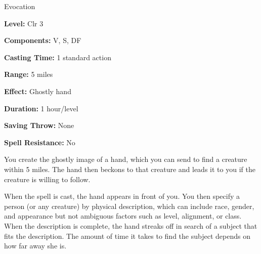 
Evocation

\textbf{Level:} Clr 3

\textbf{Components:} V, S, DF

\textbf{Casting Time:} 1 standard action

\textbf{Range:} 5 miles

\textbf{Effect:} Ghostly hand

\textbf{Duration:} 1 hour/level

\textbf{Saving Throw:} None

\textbf{Spell Resistance:} No

You create the ghostly image of a hand, which you can send to find a creature within 
5 miles. The hand then beckons to that creature and leads it to you if the creature 
is willing to follow.

When the spell is cast, the hand appears in front of you. You then specify a person 
(or any creature) by physical description, which can include race, gender, and 
appearance but not ambiguous factors such as level, alignment, or class. When the 
description is complete, the hand streaks off in search of a subject that fits 
the description. The amount of time it takes to find the subject depends on how 
far away she is.


